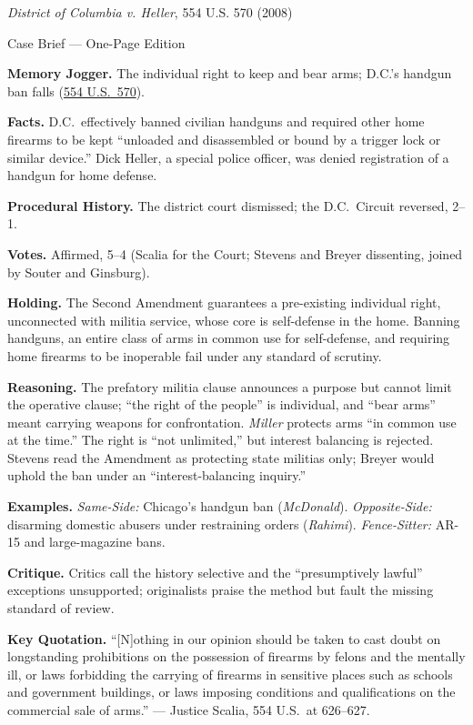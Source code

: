 \documentclass[12pt]{article}
\begin{document}
\begin{center}
{\Large \textit{District of Columbia v. Heller}, 554 U.S. 570 (2008)\par}
\vspace{0.3em}
{\normalsize Case Brief --- One-Page Edition\par}
\end{center}

\textbf{Memory Jogger.} The individual right to keep and bear arms; D.C.'s handgun ban falls (\href{https://supreme.justia.com/cases/federal/us/554/570/}{554 U.S.\ 570}).

\textbf{Facts.} D.C.\ effectively banned civilian handguns and required other home firearms to be kept ``unloaded and disassembled or bound by a trigger lock or similar device.'' Dick Heller, a special police officer, was denied registration of a handgun for home defense.

\textbf{Procedural History.} The district court dismissed; the D.C.\ Circuit reversed, 2--1.

\textbf{Votes.} Affirmed, 5--4 (Scalia for the Court; Stevens and Breyer dissenting, joined by Souter and Ginsburg).

\textbf{Holding.} The Second Amendment guarantees a pre-existing individual right, unconnected with militia service, whose core is self-defense in the home. Banning handguns, an entire class of arms in common use for self-defense, and requiring home firearms to be inoperable fail under any standard of scrutiny.

\textbf{Reasoning.} The prefatory militia clause announces a purpose but cannot limit the operative clause; ``the right of the people'' is individual, and ``bear arms'' meant carrying weapons for confrontation. \textit{Miller} protects arms ``in common use at the time.'' The right is ``not unlimited,'' but interest balancing is rejected. Stevens read the Amendment as protecting state militias only; Breyer would uphold the ban under an ``interest-balancing inquiry.''

\textbf{Examples.} \emph{Same-Side:} Chicago's handgun ban (\textit{McDonald}). \emph{Opposite-Side:} disarming domestic abusers under restraining orders (\textit{Rahimi}). \emph{Fence-Sitter:} AR-15 and large-magazine bans.

\textbf{Critique.} Critics call the history selective and the ``presumptively lawful'' exceptions unsupported; originalists praise the method but fault the missing standard of review.

\textbf{Key Quotation.} ``[N]othing in our opinion should be taken to cast doubt on longstanding prohibitions on the possession of firearms by felons and the mentally ill, or laws forbidding the carrying of firearms in sensitive places such as schools and government buildings, or laws imposing conditions and qualifications on the commercial sale of arms.'' --- Justice Scalia, 554 U.S.\ at 626--627.
\end{document}
